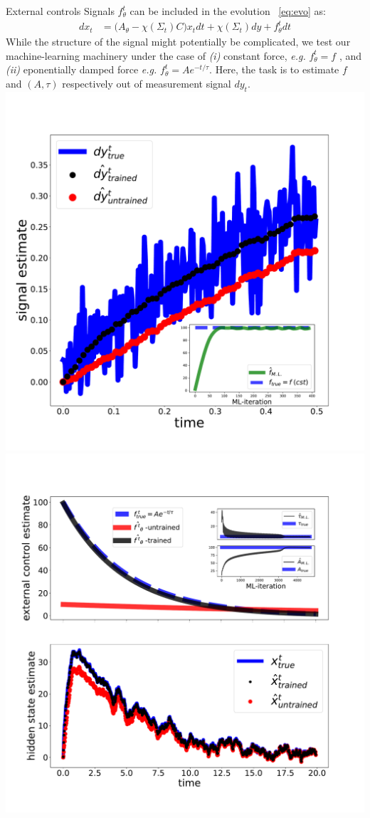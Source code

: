 \documentclass[xcolor={table}]{beamer}
\begin{document}
\begin{frame}[fragile=singleslide,t]
\begin{columns}[onlytextwidth,T]
\begin{column}{.47\textwidth}
\begin{block}{External controls}
  Signals $f^t_\theta$ can be included in the evolution ~\eqref{eq:evo} as:
  \begin{align}
  dx_t &= \big(A_\theta - \chi(\Sigma_t) C\big) x_t dt + \chi(\Sigma_t) dy + f^t_\theta dt
  \end{align}
  While the structure of the signal might potentially be complicated, we test our machine-learning machinery under the case of \textit{(i)} constant force, \textit{e.g.} $f^t_\theta = f$ , and \textit{(ii)} eponentially damped force  \textit{e.g.} $f^t_\theta = A e^{-t/\tau}$. Here, the task is to estimate $f$ and $(A, \tau)$ respectively out of measurement signal $dy_t$.
{\center
  \includegraphics[width=.9\textwidth]{figures_poster/external_learn_signals.pdf}
  \includegraphics[width=.9\textwidth]{figures_poster/external_learn_track_example2.pdf}
}
\end{block}
\end{column}
\end{columns}
\end{frame}
\end{document}
